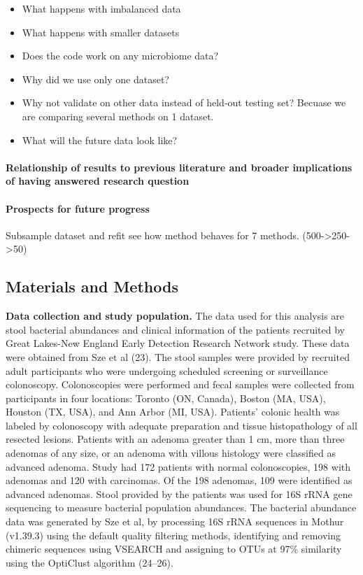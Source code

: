 \documentclass[11pt,]{article}
\let\oldparagraph\paragraph
\renewcommand{\paragraph}[1]{\oldparagraph{#1}\mbox{}}
\begin{document}
\begin{itemize}
\item
  What happens with imbalanced data
\item
  What happens with smaller datasets
\item
  Does the code work on any microbiome data?
\item
  Why did we use only one dataset?
\item
  Why not validate on other data instead of held-out testing set?
  Becuase we are comparing several methods on 1 dataset.
\item
  What will the future data look like?
\end{itemize}

\paragraph{Relationship of results to previous literature and broader
implications of having answered research
question}\label{relationship-of-results-to-previous-literature-and-broader-implications-of-having-answered-research-question}

\paragraph{Prospects for future
progress}\label{prospects-for-future-progress}

Subsample dataset and refit see how method behaves for 7 methods.
(500-\textgreater{}250-\textgreater{}50)

\subsection{Materials and Methods}\label{materials-and-methods}

\textbf{Data collection and study population.} The data used for this
analysis are stool bacterial abundances and clinical information of the
patients recruited by Great Lakes-New England Early Detection Research
Network study. These data were obtained from Sze et al (23). The stool
samples were provided by recruited adult participants who were
undergoing scheduled screening or surveillance colonoscopy.
Colonoscopies were performed and fecal samples were collected from
participants in four locations: Toronto (ON, Canada), Boston (MA, USA),
Houston (TX, USA), and Ann Arbor (MI, USA). Patients' colonic health was
labeled by colonoscopy with adequate preparation and tissue
histopathology of all resected lesions. Patients with an adenoma greater
than 1 cm, more than three adenomas of any size, or an adenoma with
villous histology were classified as advanced adenoma. Study had 172
patients with normal colonoscopies, 198 with adenomas and 120 with
carcinomas. Of the 198 adenomas, 109 were identified as advanced
adenomas. Stool provided by the patients was used for 16S rRNA gene
sequencing to measure bacterial population abundances. The bacterial
abundance data was generated by Sze et al, by processing 16S rRNA
sequences in Mothur (v1.39.3) using the default quality filtering
methods, identifying and removing chimeric sequences using VSEARCH and
assigning to OTUs at 97\% similarity using the OptiClust algorithm
(24--26).
\end{document}
